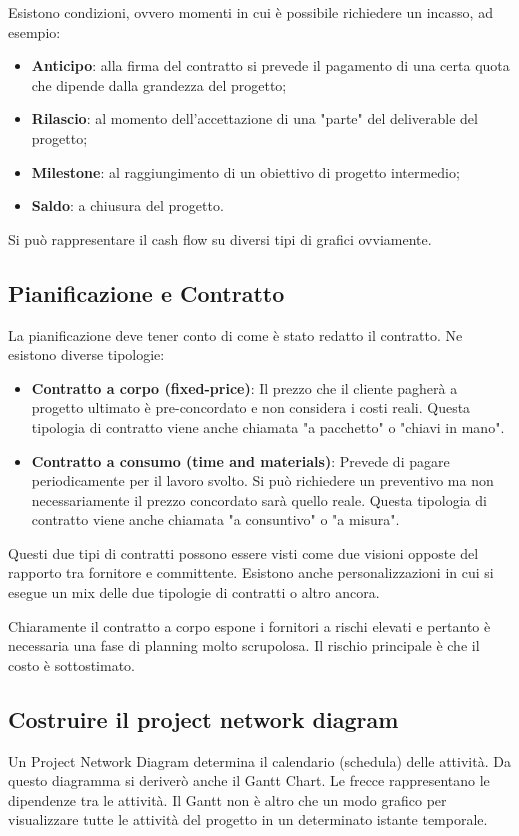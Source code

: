 \noindent Esistono condizioni, ovvero momenti in cui è possibile richiedere un incasso, ad esempio:
\begin{itemize}
	\item \textbf{Anticipo}: alla firma del contratto si prevede il pagamento di una certa quota che dipende dalla grandezza del progetto;
	\item \textbf{Rilascio}: al momento dell'accettazione di una "parte" del deliverable del progetto;
	\item \textbf{Milestone}: al raggiungimento di un obiettivo di progetto intermedio;
	\item \textbf{Saldo}: a chiusura del progetto.
\end{itemize}
Si può rappresentare il cash flow su diversi tipi di grafici ovviamente.
\subsection{Pianificazione e Contratto}
La pianificazione deve tener conto di come è stato redatto il contratto. Ne esistono diverse tipologie:
\begin{itemize}
	\item \textbf{Contratto a corpo (fixed-price)}: Il prezzo che il cliente pagherà a progetto ultimato è pre-concordato e non considera i costi reali. Questa tipologia di contratto viene anche chiamata "a pacchetto" o "chiavi in mano".
	\item \textbf{Contratto a consumo (time and materials)}: Prevede di pagare periodicamente per il lavoro svolto. Si può richiedere un preventivo ma non necessariamente il prezzo concordato sarà quello reale. Questa tipologia di contratto viene anche chiamata "a consuntivo" o "a misura".
\end{itemize}
Questi due tipi di contratti possono essere visti come due visioni opposte del rapporto tra fornitore e committente. Esistono anche personalizzazioni in cui si esegue un mix delle due tipologie di contratti o altro ancora.

\noindent Chiaramente il contratto a corpo espone i fornitori a rischi elevati e pertanto è necessaria una fase di planning molto scrupolosa. Il rischio principale è che il costo è sottostimato.
\subsection{Costruire il project network diagram}
Un Project Network Diagram determina il calendario (schedula) delle attività. Da questo diagramma si deriverò anche il Gantt Chart. Le frecce rappresentano le dipendenze tra le attività. Il Gantt non è altro che un modo grafico per visualizzare tutte le attività del progetto in un determinato istante temporale.
